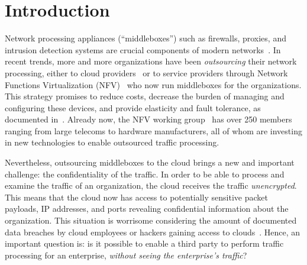 

\section{Introduction}\label{sec:intro}


    Network processing appliances (``middleboxes'') such as firewalls, proxies, and intrusion detection systems are crucial components of modern networks~\cite{aplomb}. 
     In recent trends, more and more organizations have been {\it outsourcing} their network processing, either to cloud providers~\cite{aplomb, aryaka, zscalar} or to service providers through Network Functions Virtualization (NFV)~\cite{nfv} who now run  middleboxes for the organizations. This strategy promises to reduce costs, decrease the burden of managing and configuring these devices, and provide elasticity and fault tolerance, as documented in~\cite{aplomb}.
Already now, the NFV working group~\cite{nfvwg} has over 250 members ranging from large telecoms to hardware manufacturers, all of whom are investing in new technologies to enable outsourced traffic processing.
   
   Nevertheless, outsourcing middleboxes to the cloud brings a new and important challenge: the confidentiality of the traffic. In order to be able to process and examine the traffic of an organization, the cloud  receives  the traffic {\em unencrypted}.  This means that the cloud now has access to potentially sensitive packet payloads,  IP addresses, and ports revealing confidential information about the organization. This situation is worrisome considering the amount of documented data breaches by cloud employees or hackers gaining access to clouds~\cite{XXX}.
   Hence, an important question is: is it possible to enable a third party to perform traffic processing for an enterprise, {\em without seeing the enterprise's traffic}?
   
   
   

